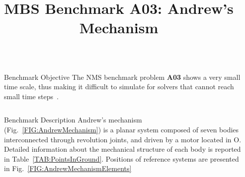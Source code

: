 \documentclass[final]{beamer}
\title{MBS Benchmark A03: Andrew's Mechanism} %
\newlength{\sepwid}
\newlength{\onecolwid}
\newlength{\twocolwid}
\begin{document}

\setlength{\belowcaptionskip}{2ex} %
\setlength\belowdisplayshortskip{2ex} %

\begin{frame}[t] %

\begin{columns}[t] %

\begin{column}{\sepwid}\end{column} %

\begin{column}{\twocolwid} %


\begin{alertblock}{Benchmark Objective}
The NMS benchmark problem \textbf{A03} shows a very small time scale, thus making it difficult to simulate for solvers that cannot reach small time steps~\cite{gonzalez2006benchmarking}.
\end{alertblock}








\begin{columns}[t, totalwidth=\twocolwid]

\begin{column}{\onecolwid}
\begin{block}{Benchmark Description}
Andrew's mechanism~\cite{Schiehlen1990Multibody} (Fig.~\ref{FIG:AndrewMechanism}) is a planar system composed of seven bodies interconnected through revolution joints, and driven by a motor located in O.
Detailed information about the mechanical structure of each body is reported in  Table~\ref{TAB:PointsInGround}. Positions of reference systems are presented in Fig.~\ref{FIG:AndrewMechanismElements}


\end{block}
\end{column}
\end{columns}
\end{column}
\end{columns}
\end{frame}
\end{document}
